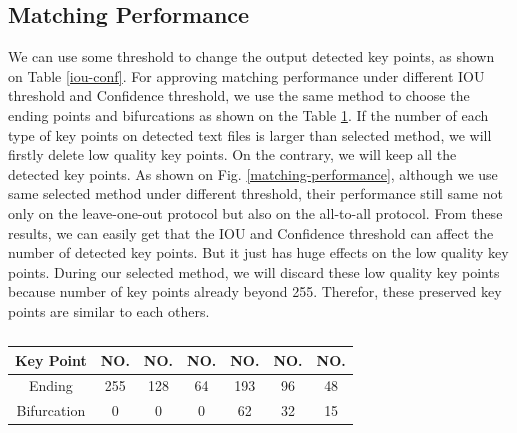 \subsection{Matching Performance}
We can use some threshold to change the output detected key points, as shown on Table \ref{iou-conf}. For approving matching performance under different IOU threshold and Confidence threshold, we use the same method to choose the ending points and bifurcations as shown on the Table \ref{number-of-key-points}. If the number of each type of key points on detected text files is larger than selected method, we will firstly delete low quality key points. On the contrary, we will keep all the detected key points. As shown on Fig. \ref{matching-performance}, although we use same selected method under different threshold, their performance still same not only on the leave-one-out protocol but also on the all-to-all protocol. From these results, we can easily get that the IOU and Confidence threshold can affect the number of detected key points. But it just has huge effects on the low quality key points. During our selected method, we will discard these low quality key points because number of key points already beyond 255. Therefor, these preserved key points are similar to each others.

\begin{table}[h]
    \centering
    \caption{}
    \begin{tabular}{ccccccc}
    \hline
    Key Point   & NO. & NO. & NO. & NO. & NO. & NO. \\ \hline
    Ending      & 255 & 128 & 64  & 193 & 96  & 48  \\
    Bifurcation & 0   & 0   & 0   & 62  & 32  & 15  \\ \hline
    \end{tabular}
    \label{number-of-key-points}
\end{table}

